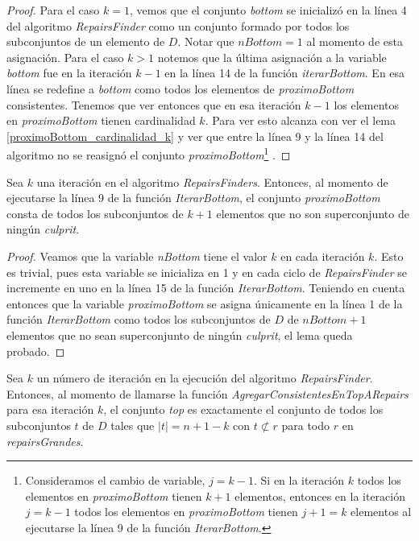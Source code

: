 \documentclass[11pt,a4paper,twoside]{tesis}
\begin{document}
\begin{proof}
Para el caso $k = 1$, vemos que el conjunto \textit{bottom} se inicializó en la línea 4 del algoritmo \textit{RepairsFinder} como un conjunto formado por todos los subconjuntos de un elemento de $D$. Notar que $nBottom = 1$ al momento de esta asignación. Para el caso $k>1$ notemos que la última asignación a la variable \textit{bottom} fue en la iteración $k-1$ en la línea 14 de la función \textit{iterarBottom}. En esa línea se redefine a \textit{bottom} como todos los elementos de \textit{proximoBottom} consistentes. Tenemos que ver entonces que en esa iteración $k-1$ los elementos en \textit{proximoBottom} tienen cardinalidad $k$. Para ver esto alcanza con ver el lema \ref{proximoBottom_cardinalidad_k} y ver que entre la línea 9 y la línea 14 del algoritmo no se reasignó el conjunto \textit{proximoBottom}\footnote{Consideramos el cambio de variable, $j = k-1$. Si en la iteración $k$ todos los elementos en \textit{proximoBottom} tienen $k+1$ elementos, entonces en la iteración $j = k-1$ todos los elementos en \textit{proximoBottom} tienen $j + 1 = k$ elementos al ejecutarse la línea 9 de la función \textit{IterarBottom}.} .
\end{proof}

\begin{lemma}\label{proximoBottom_cardinalidad_k}
Sea $k$ una iteración en el algoritmo \textit{RepairsFinders}. Entonces, al momento de ejecutarse la línea 9 de la función \textit{IterarBottom}, el conjunto \textit{proximoBottom} consta de todos los subconjuntos de $k + 1$ elementos que no son superconjunto de ningún \textit{culprit}.
\end{lemma}

\begin{proof}
Veamos que la variable \textit{nBottom} tiene el valor $k$ en cada iteración $k$. Esto es trivial, pues esta variable se inicializa en 1 y en cada ciclo de \textit{RepairsFinder} se incremente en uno en la línea 15 de la función \textit{IterarBottom}. Teniendo en cuenta entonces que la variable \textit{proximoBottom} se asigna únicamente en la línea 1 de la función \textit{IterarBottom} como todos los subconjuntos de  $D$ de $nBottom + 1$ elementos que no sean superconjunto de ningún \textit{culprit}, el lema queda probado.
\end{proof}


\begin{lemma}\label{tamano_top_2}
Sea $k$ un número de iteración en la ejecución del algoritmo \textit{RepairsFinder}. Entonces, al momento de llamarse la función \textit{AgregarConsistentesEnTopARepairs} para esa iteración $k$, el conjunto \textit{top} es exactamente el conjunto de todos los subconjuntos $t$ de $D$ tales que $|t| = n + 1 - k$ con $t \not\subset r$ para todo $r$ en \textit{repairsGrandes}.
\end{lemma}
\end{document}
